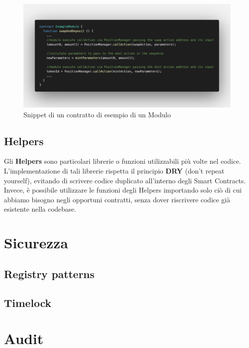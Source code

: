 \documentclass[12pt,a4paper]{report}
\begin{document}
\begin{figure}[H]
  \includegraphics[scale=0.26]{example_module.png}
  \centering
  \caption{Snippet di un contratto di esempio di un Modulo}
  \label{fig:example_module}
\end{figure}

\subsection{Helpers}

Gli \textbf{Helpers} sono particolari librerie o funzioni utilizzabili più volte nel codice.
L'implementazione di tali librerie rispetta il principio \textbf{DRY} (don't repeat yourself), evitando di scrivere codice duplicato all'interno degli Smart Contracts.
\\Invece, è possibile utilizzare le funzioni degli Helpers importando solo ciò di cui abbiamo bisogno negli opportuni contratti, senza dover riscrivere codice già esistente nella codebase.

\section{Sicurezza}

\subsection{Registry patterns} \label{registry}

\subsection{Timelock}

\section{Audit}
\end{document}
